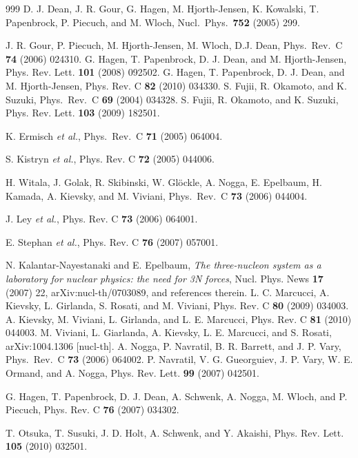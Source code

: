 \documentclass[sort&compress,preprint,3p]{elsarticle}
\begin{document}
\begin{thebibliography}{999}
D. J. Dean, J. R. Gour, G. Hagen, M. Hjorth-Jensen, K. Kowalski, T. Papenbrock, P. Piecuch, and M. Wloch, 
Nucl.\ Phys.\ {\bf 752} (2005) 299.

J. R. Gour, P. Piecuch, M. Hjorth-Jensen, M. Wloch, D.J. Dean, 
Phys.\ Rev.\ C {\bf 74} (2006) 024310.
G. Hagen, T. Papenbrock, D. J. Dean, and M. Hjorth-Jensen,
Phys. Rev. Lett. {\bf 101} (2008) 092502.
G. Hagen, T. Papenbrock, D. J. Dean, and M. Hjorth-Jensen,
Phys. Rev. C {\bf 82} (2010) 034330.
 S. Fujii, R. Okamoto, and K. Suzuki,
Phys.\ Rev.\ C {\bf 69} (2004) 034328.
 S. Fujii, R. Okamoto, and K. Suzuki,
Phys. Rev. Lett. {\bf 103} (2009) 182501.

 K. Ermisch {\it et al.}, Phys.\ Rev.\ C
{\bf 71} (2005) 064004.

S. Kistryn {\it et al.}, Phys. Rev. C {\bf 72} (2005) 044006.

 H. Witala, J. Golak, R. Skibinski, W. Gl\"ockle, A. Nogga,
E. Epelbaum, H. Kamada, A. Kievsky, and M. Viviani,
Phys.\ Rev.\ C {\bf 73} (2006) 044004.

J. Ley {\it et al.}, Phys. Rev. C {\bf 73} (2006) 064001.

E. Stephan {\it et al.}, Phys. Rev. C {\bf 76} (2007) 057001.

N. Kalantar-Nayestanaki and E. Epelbaum, 
{\it The three-nucleon system as a laboratory for nuclear physics:
the need for 3N forces}, Nucl. Phys. News {\bf 17} (2007) 22,
arXiv:nucl-th/0703089, and references therein.
L. C. Marcucci, A. Kievsky, L. Girlanda, S. Rosati, and M. Viviani,
{ Phys. Rev.} C {\bf 80} (2009) 034003.
A. Kievsky, M. Viviani, L. Girlanda, and L. E. Marcucci,
Phys. Rev. C {\bf 81} (2010) 044003.
M. Viviani, L. Giarlanda, A. Kievsky, L. E. Marcucci, and S. Rosati,
arXiv:1004.1306 [nucl-th].
A. Nogga, P. Navratil, B. R. Barrett, and J. P. Vary,
Phys.\ Rev.\ C {\bf 73} (2006) 064002.
P. Navratil, V. G. Gueorguiev, J. P. Vary, W. E. Ormand,
and A. Nogga, Phys. Rev. Lett. {\bf 99} (2007) 042501.

G. Hagen, T. Papenbrock, D. J. Dean,  A. Schwenk,  A. Nogga,  M. Wloch, and P. Piecuch,
Phys. Rev. C {\bf 76} (2007) 034302.

T. Otsuka, T. Susuki, J. D. Holt, A. Schwenk, and Y. Akaishi,
Phys. Rev. Lett. {\bf 105} (2010) 032501.


\end{thebibliography}
\end{document}
